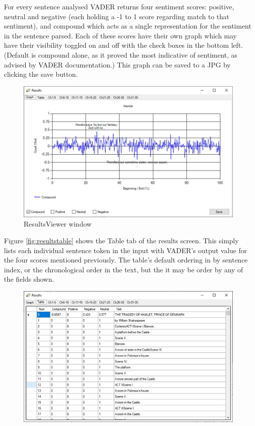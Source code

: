 \documentclass{article}
\begin{document}
{        For every sentence analysed VADER returns four sentiment scores: positive, neutral and negative (each holding a -1 to 1 score regarding match to that sentiment), and compound which acts as a single representation for the sentiment in the sentence parsed. Each of these scores have their own graph which may have their visibility toggled on and off with the check boxes in the bottom left. (Default is compound alone, as it proved the most indicative of sentiment, as advised by VADER documentation.) This graph can be saved to a JPG by clicking the save button.
        \begin{figure}[htbp]
            \includegraphics[width=1\textwidth]{Figures/Misc/resultsviewer}
            \caption{ResultsViewer window}
            \label{fig:resultsviewer}
        \end{figure}
        Figure \ref{fig:resultstable} shows the Table tab of the results screen. This simply lists each individual sentence token in the input with VADER’s output value for the four scores mentioned previously. The table’s default ordering in by sentence index, or the chronological order in the text, but the it may be order by any of the fields shown.
        \begin{figure}[H]
            \includegraphics[width=1\textwidth]{Figures/Misc/resultstable}

\end{figure}}
\end{document}
